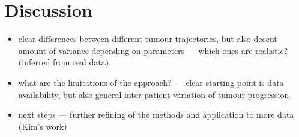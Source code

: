 \section{Discussion}
\begin{itemize}
    \item clear differences between different tumour trajectories, but also decent amount of variance depending on parameters --- which ones are realistic? (inferred from real data)
    \item what are the limitations of the approach? --- clear starting point is data availability, but also general inter-patient variation of tumour progression
    \item next steps --- further refining of the methods and application to more data (Kim's work)
\end{itemize}
